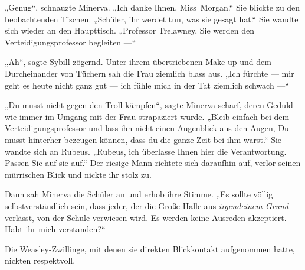 „Genug“, schnauzte Minerva.
„Ich danke Ihnen, Miss~Morgan.“ Sie blickte zu den beobachtenden Tischen.
„Schüler, ihr werdet tun, was sie gesagt hat.“ Sie wandte sich wieder an den Haupttisch.
„Professor Trelawney, Sie werden den Verteidigungsprofessor begleiten —“

„Ah“, sagte Sybill zögernd. Unter ihrem übertriebenen Make-up und dem Durcheinander von Tüchern sah die Frau ziemlich blass aus.
„Ich fürchte — mir geht es heute nicht ganz gut — ich fühle mich in der Tat ziemlich schwach —“

„Du musst nicht gegen den Troll kämpfen“, sagte Minerva scharf, deren Geduld wie immer im Umgang mit der Frau strapaziert wurde.
„Bleib einfach bei dem Verteidigungsprofessor und lass ihn nicht einen Augenblick aus den Augen, Du musst hinterher bezeugen können, dass du die ganze Zeit bei ihm warst.“ Sie wandte sich an Rubeus.
„Rubeus, ich überlasse Ihnen hier die Verantwortung. Passen Sie auf sie auf.“
Der riesige Mann richtete sich daraufhin auf, verlor seinen mürrischen Blick und nickte ihr stolz zu.

Dann sah Minerva die Schüler an und erhob ihre Stimme.
„Es sollte völlig selbstverständlich sein, dass jeder, der die Große Halle aus \emph{irgendeinem Grund} verlässt, von der Schule verwiesen wird. Es werden keine Ausreden akzeptiert. Habt ihr mich verstanden?“

Die Weasley-Zwillinge, mit denen sie direkten Blickkontakt aufgenommen hatte, nickten respektvoll.

